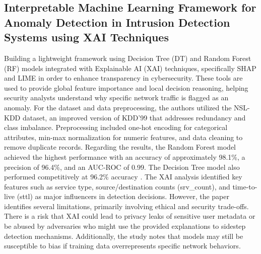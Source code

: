 \documentclass[12pt, a4paper]{article}
\begin{document}
\subsection*{Interpretable Machine Learning Framework for Anomaly Detection in Intrusion Detection Systems using XAI Techniques}
Building a lightweight framework using Decision Tree (DT) and Random Forest (RF) models integrated with Explainable AI (XAI) techniques, specifically SHAP and LIME in order to enhance transparency in cybersecurity. These tools are used to provide global feature importance and local decision reasoning, helping security analysts understand why specific network traffic is flagged as an anomaly. For the dataset and data preprocessing, the authors utilized the NSL-KDD dataset, an improved version of KDD’99 that addresses redundancy and class imbalance. Preprocessing included one-hot encoding for categorical attributes, min-max normalization for numeric features, and data cleaning to remove duplicate records. Regarding the results, the Random Forest model achieved the highest performance with an accuracy of approximately 98.1\%, a precision of 96.4\%, and an AUC-ROC of 0.99. The Decision Tree model also performed competitively at 96.2\% accuracy \cite{Interpretable_ML_for_IDS_Anomaly_Detection}. The XAI analysis identified key features such as service type, source/destination counts (srv\_count), and time-to-live (sttl) as major influencers in detection decisions. However, the paper identifies several limitations, primarily involving ethical and security trade-offs. There is a risk that XAI could lead to privacy leaks of sensitive user metadata or be abused by adversaries who might use the provided explanations to sidestep detection mechanisms. Additionally, the study notes that models may still be susceptible to bias if training data overrepresents specific network behaviors. 
\end{document}
